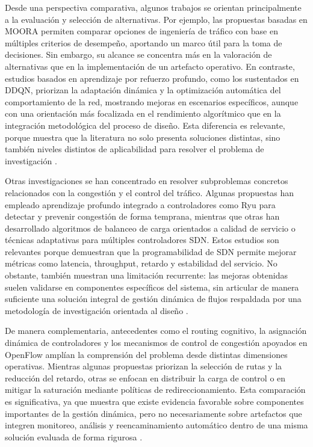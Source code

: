 \documentclass[12pt,a4paper]{article}
\begin{document}
Desde una perspectiva comparativa, algunos trabajos se orientan principalmente a la evaluación y selección de alternativas. Por ejemplo, las propuestas basadas en MOORA permiten comparar opciones de ingeniería de tráfico con base en múltiples criterios de desempeño, aportando un marco útil para la toma de decisiones. Sin embargo, su alcance se concentra más en la valoración de alternativas que en la implementación de un artefacto operativo. En contraste, estudios basados en aprendizaje por refuerzo profundo, como los sustentados en DDQN, priorizan la adaptación dinámica y la optimización automática del comportamiento de la red, mostrando mejoras en escenarios específicos, aunque con una orientación más focalizada en el rendimiento algorítmico que en la integración metodológica del proceso de diseño. Esta diferencia es relevante, porque muestra que la literatura no solo presenta soluciones distintas, sino también niveles distintos de aplicabilidad para resolver el problema de investigación \parencite{moora_sdn, ddqn_sdn}.

Otras investigaciones se han concentrado en resolver subproblemas concretos relacionados con la congestión y el control del tráfico. Algunas propuestas han empleado aprendizaje profundo integrado a controladores como Ryu para detectar y prevenir congestión de forma temprana, mientras que otras han desarrollado algoritmos de balanceo de carga orientados a calidad de servicio o técnicas adaptativas para múltiples controladores SDN. Estos estudios son relevantes porque demuestran que la programabilidad de SDN permite mejorar métricas como latencia, throughput, retardo y estabilidad del servicio. No obstante, también muestran una limitación recurrente: las mejoras obtenidas suelen validarse en componentes específicos del sistema, sin articular de manera suficiente una solución integral de gestión dinámica de flujos respaldada por una metodología de investigación orientada al diseño \parencite{dynamic_lb_sdn, deep_learning_ryu, qos_lb_sdn, adaptive_lb_sdn}.

De manera complementaria, antecedentes como el routing cognitivo, la asignación dinámica de controladores y los mecanismos de control de congestión apoyados en OpenFlow amplían la comprensión del problema desde distintas dimensiones operativas. Mientras algunas propuestas priorizan la selección de rutas y la reducción del retardo, otras se enfocan en distribuir la carga de control o en mitigar la saturación mediante políticas de redireccionamiento. Esta comparación es significativa, ya que muestra que existe evidencia favorable sobre componentes importantes de la gestión dinámica, pero no necesariamente sobre artefactos que integren monitoreo, análisis y reencaminamiento automático dentro de una misma solución evaluada de forma rigurosa \parencite{cognitive_routing_sdn, controller_assignment_sdn, red_openflow_sdn}.
\end{document}
